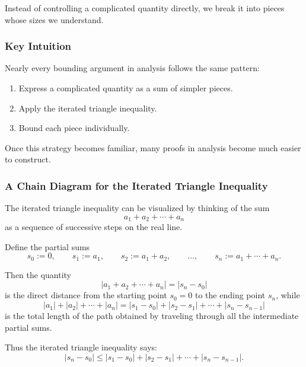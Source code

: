Instead of controlling a complicated quantity directly, we break it into
pieces whose sizes we understand.

\bigskip

\subsubsection*{Key Intuition}

Nearly every bounding argument in analysis follows the same pattern:

\begin{enumerate}
\item Express a complicated quantity as a sum of simpler pieces.
\item Apply the iterated triangle inequality.
\item Bound each piece individually.
\end{enumerate}

Once this strategy becomes familiar, many proofs in analysis become much
easier to construct.

\subsubsection*{A Chain Diagram for the Iterated Triangle Inequality}

The iterated triangle inequality can be visualized by thinking of the
sum
\[
a_1 + a_2 + \cdots + a_n
\]
as a sequence of successive steps on the real line.

Define the partial sums
\[
s_0 := 0,
\qquad
s_1 := a_1,
\qquad
s_2 := a_1+a_2,
\qquad
\dots,
\qquad
s_n := a_1+\cdots+a_n.
\]

Then the quantity
\[
|a_1+a_2+\cdots+a_n| = |s_n-s_0|
\]
is the direct distance from the starting point \(s_0=0\) to the ending
point \(s_n\), while
\[
|a_1|+|a_2|+\cdots+|a_n|
=
|s_1-s_0|+|s_2-s_1|+\cdots+|s_n-s_{n-1}|
\]
is the total length of the path obtained by traveling through all the
intermediate partial sums.

Thus the iterated triangle inequality says:
\[
|s_n-s_0|
\le
|s_1-s_0|+|s_2-s_1|+\cdots+|s_n-s_{n-1}|.
\]

